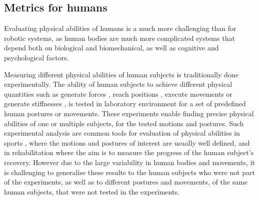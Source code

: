 \subsection{Metrics for humans}

Evaluating physical abilities of humans is a much more challenging than for robotic systems, as human bodies are much more complicated systems that depend both on biological and biomechanical, as well as cognitive and psychological factors.

Measuring different physical abilities of human subjects is traditionally done experimentally. The ability of human subjects to achieve different physical quantities such as generate forces \cite{HODDER2016Testing,HOLZBAUR20072442}, reach positions \cite{CASTRO2019108}, execute movements \cite{Jessop2016} or generate stiffnesses \cite{Tsuji1995,Artemiadis2010}, is tested in laboratory environment for a set of predefined human postures or movements. These experiments enable finding precise physical abilities of one or multiple subjects, for the tested motions and postures.  Such experimental analysis are common tools for evaluation of physical abilities in sports \cite{Jessop2016}, where the motions and postures of interest are usually well defined, and in rehabilitation \cite{HAISMA2006741} where the aim is to measure the progress of the human subject's recovery. However due to the large variability in human bodies and movements, it is challenging to generalise these results to the human subjects who were not part of the experiments, as well as to different postures and movements, of the same human subjects, that were not tested in the experiments.

